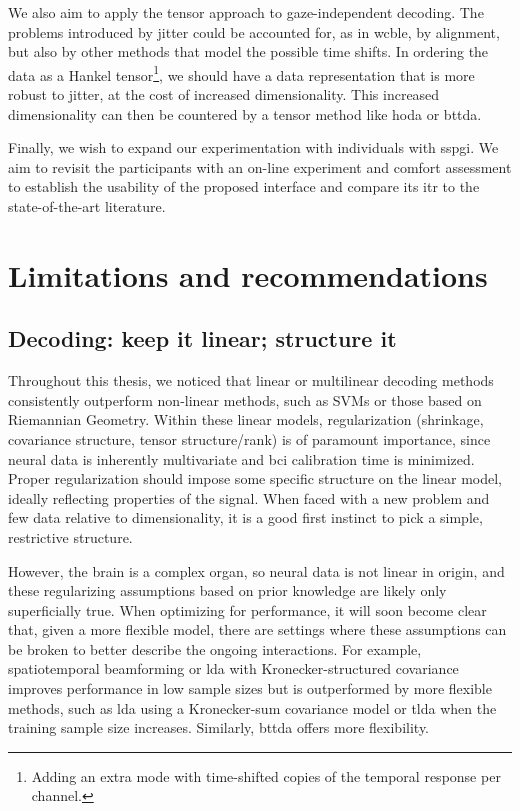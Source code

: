 We also aim to apply the tensor approach to gaze-independent decoding.
The problems introduced by jitter could be accounted for, as in \ac{wcble}, by
alignment, but also by other methods that model the possible time shifts.
In ordering the data as a Hankel tensor\footnote{Adding an extra mode with
time-shifted copies of the temporal response per channel.}, we should have a
data representation that is more robust to jitter, at the cost of increased
dimensionality.
This increased dimensionality can then be countered by a tensor method like
\ac{hoda} or \ac{bttda}.

Finally, we wish to expand our experimentation with individuals with
\ac{sspgi}.
We aim to revisit the participants with an on-line experiment and comfort
assessment to establish the usability of the proposed interface and compare its
\ac{itr} to the state-of-the-art literature.


\section{Limitations and recommendations}

\subsection{Decoding: keep it linear; structure it}

Throughout this thesis, we noticed that linear or multilinear decoding
methods consistently outperform non-linear methods, such as SVMs or those based
on Riemannian Geometry.
Within these linear models, regularization (shrinkage, covariance structure,
tensor structure/rank) is of paramount importance, since neural data is
inherently multivariate and \ac{bci} calibration time is minimized.
Proper regularization should impose some specific structure on the linear model,
ideally reflecting properties of the signal.
When faced with a new problem and few data relative to dimensionality, it is a
good first instinct to pick a simple, restrictive structure.

However, the brain is a complex organ, so neural data is not linear in origin, and
these regularizing assumptions based on prior knowledge are likely only
superficially true.
When optimizing for performance, it will soon become clear that, given a more
flexible model, there are
settings where these assumptions can be broken to better describe the ongoing
interactions.
For example, spatiotemporal beamforming or \ac{lda} with Kronecker-structured covariance
improves performance in low sample sizes but is outperformed by more flexible
methods, such as \ac{lda} using a Kronecker-sum covariance model or \ac{tlda}
when the training sample size increases.
Similarly, \ac{bttda} offers more flexibility.

